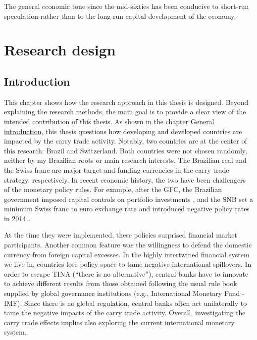 \documentclass[a4paper, twoside]{templates/ociamthesis}
\begin{document}
\begin{savequote}
The general economic tone since the mid-sixties has been conducive to
short-run speculation rather than to the long-run capital development of
the economy.
\end{savequote}



\hypertarget{two}{%
\chapter{Research design}\label{two}}

\minitoc

\hypertarget{twoone}{%
\section{Introduction}\label{twoone}}

\noindent This chapter shows how the research approach in this thesis is designed. Beyond explaining the research methods, the main goal is to provide a clear view of the intended contribution of this thesis. As shown in the chapter \protect\hyperlink{general-introduction}{General introduction}, this thesis questions how developing and developed countries are impacted by the carry trade activity. Notably, two countries are at the center of this research: Brazil and Switzerland. Both countries were not chosen randomly, neither by my Brazilian roots or main research interests. The Brazilian real and the Swiss franc are major target and funding currencies in the carry trade strategy, respectively. In recent economic history, the two have been challengers of the monetary policy rules. For example, after the GFC, the Brazilian government imposed capital controls on portfolio investments \autocite{tomio2011,centralbankofbrazil2013}, and the SNB set a minimum Swiss franc to euro exchange rate \autocite{swissnationalbank2011} and introduced negative policy rates in 2014 \autocite{swissnationalbank2014}.

At the time they were implemented, these policies surprised financial market participants. Another common feature was the willingness to defend the domestic currency from foreign capital excesses. In the highly intertwined financial system we live in, countries lose policy space to tame negative international spillovers. In order to escape TINA (``there is no alternative''), central banks have to innovate to achieve different results from those obtained following the usual rule book supplied by global governance institutions (e.g., International Monetary Fund - IMF). Since there is no global regulation, central banks often act unilaterally to tame the negative impacts of the carry trade activity. Overall, investigating the carry trade effects implies also exploring the current international monetary system.
\end{document}
